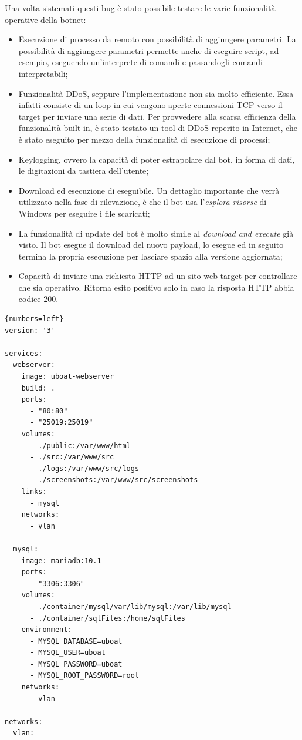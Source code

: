 Una volta sistemati questi bug è stato possibile testare le varie funzionalità operative della botnet:
\begin{itemize}
    \item Esecuzione di processo da remoto con possibilità di aggiungere parametri. La possibilità di aggiungere parametri permette anche di eseguire script, ad esempio, eseguendo un'interprete di comandi e passandogli comandi interpretabili;
    \item Funzionalità DDoS, seppure l'implementazione non sia molto efficiente. Essa infatti consiste di un loop in cui vengono aperte connessioni TCP verso il target per inviare una serie di dati. Per provvedere alla scarsa efficienza della funzionalità built-in, è stato testato un tool di DDoS reperito in Internet, che è stato eseguito per mezzo della funzionalità di esecuzione di processi;
    \item Keylogging, ovvero la capacità di poter estrapolare  dal bot, in forma di dati, le digitazioni da tastiera dell'utente;
    \item Download ed esecuzione di eseguibile. Un dettaglio importante che verrà utilizzato nella fase di rilevazione, è che il bot usa l'\textit{esplora risorse} di Windows per eseguire i file scaricati;
    \item La funzionalità di update del bot è molto simile al \textit{download and execute} già visto. Il bot esegue il download del nuovo payload, lo esegue ed in seguito termina la propria esecuzione per lasciare spazio alla versione aggiornata;
    \item Capacità di inviare una richiesta HTTP ad un sito web target per controllare che sia operativo. Ritorna esito positivo solo in caso la risposta HTTP abbia codice 200.
\end{itemize}





\begin{lstlisting}[firstnumber=1,floatplacement=H,caption={File di configurazione docker compose.},captionpos=b,label={listing-uboat2}]{numbers=left}
version: '3'

services:
  webserver:
    image: uboat-webserver
    build: .
    ports:
      - "80:80"
      - "25019:25019"
    volumes:
      - ./public:/var/www/html
      - ./src:/var/www/src
      - ./logs:/var/www/src/logs
      - ./screenshots:/var/www/src/screenshots
    links:
      - mysql
    networks:
      - vlan

  mysql:
    image: mariadb:10.1
    ports:
      - "3306:3306"
    volumes:
      - ./container/mysql/var/lib/mysql:/var/lib/mysql
      - ./container/sqlFiles:/home/sqlFiles
    environment:
      - MYSQL_DATABASE=uboat
      - MYSQL_USER=uboat
      - MYSQL_PASSWORD=uboat
      - MYSQL_ROOT_PASSWORD=root
    networks:
      - vlan

networks:
  vlan:
\end{lstlisting}

